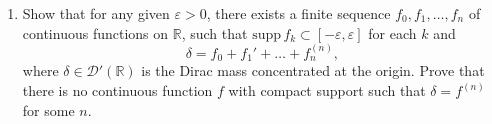 \documentclass[11pt]{amsart}
\newcommand{\R}{\mathbb{R}}
\newcommand{\tstD}{\mathscr{D}}
\newcommand{\eps}{\varepsilon}
\newcommand{\supp}{\mathrm{supp}}
\begin{document}
\begin{enumerate}[1.]
\begin{enumerate}[{\em a)}]
Show that there exists $g\in C(\R^n)$ such that $u=\partial_1^{m+2}\ldots\partial_n^{m+2}  g$ in $\Omega$.
\item
Let $u\in\tstD'(\Omega)$. Show that for any open $\omega\subset\Omega$ with $\overline\omega\Subset\Omega$,
there exists $g\in C(\R^n)$ and a multi-index $\alpha$ such that $u=\partial^\alpha  g$ in $\omega$.
\end{enumerate}
\item
Show that for any given $\eps>0$, there exists a finite sequence $f_0,f_1,\ldots,f_n$ of continuous functions on $\R$,
such that $\supp\,f_k\subset[-\eps,\eps]$ for each $k$ and 
$$
\delta = f_0 + f_1' + \ldots + f_n^{(n)},
$$
where $\delta\in\tstD'(\R)$ is the Dirac mass concentrated at the origin.
Prove that there is no continuous function $f$ with compact support such that $\delta=f^{(n)}$ for some $n$.
\end{enumerate}
\end{document}
